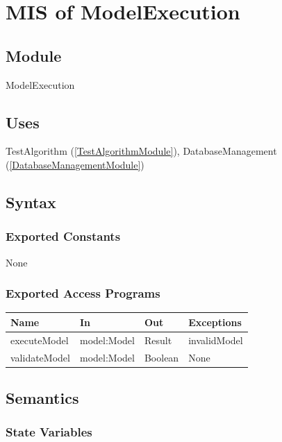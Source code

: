 \documentclass[12pt, titlepage]{article}
\begin{document}
\newpage

\section{MIS of ModelExecution} \label{ModelExecutionModule}

\subsection{Module}

ModelExecution

\subsection{Uses}

TestAlgorithm (\ref{TestAlgorithmModule}), DatabaseManagement (\ref{DatabaseManagementModule})

\subsection{Syntax}

\subsubsection{Exported Constants}

None

\subsubsection{Exported Access Programs}

\begin{center}
\begin{tabular}{p{3cm} p{3cm} p{4cm} p{3cm}}
\hline
\textbf{Name} & \textbf{In} & \textbf{Out} & \textbf{Exceptions} \\
\hline
executeModel & model:Model & Result & invalidModel \\
\hline
validateModel & model:Model & Boolean & None \\
\hline
\end{tabular}
\end{center}

\subsection{Semantics}

\subsubsection{State Variables}
\end{document}
